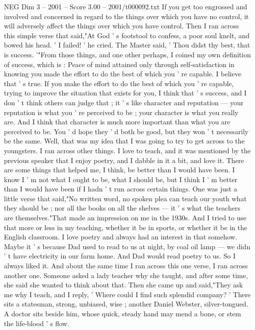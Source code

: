 \begin{textsample}{NEG Dim 3 – 2001 – Score 3.00 – 2001/t000092.txt}
If you get too engrossed and involved and concerned in regard to the things over which you have no control, it will adversely affect the things over which you have control.
Then I ran across this simple verse that said,"At God ' s footstool to confess, a poor soul knelt, and bowed his head. ' I failed! ' he cried.
The Master said, ' Thou didst thy best, that is success. '"From those things, and one other perhaps, I coined my own definition of success, which is : Peace of mind attained only through self-satisfaction in knowing you made the effort to do the best of which you ' re capable.
I believe that ' s true.
If you make the effort to do the best of which you ' re capable, trying to improve the situation that exists for you, I think that ' s success, and I don ' t think others can judge that ; it ' s like character and reputation — your reputation is what you ' re perceived to be ; your character is what you really are.
And I think that character is much more important than what you are perceived to be.
You ' d hope they ' d both be good, but they won ' t necessarily be the same.
Well, that was my idea that I was going to try to get across to the youngsters.
I ran across other things.
I love to teach, and it was mentioned by the previous speaker that I enjoy poetry, and I dabble in it a bit, and love it.
There are some things that helped me, I think, be better than I would have been.
I know I ' m not what I ought to be, what I should be, but I think I ' m better than I would have been if I hadn ' t run across certain things.
One was just a little verse that said,"No written word, no spoken plea can teach our youth what they should be ; nor all the books on all the shelves — it ' s what the teachers are themselves."That made an impression on me in the 1930s.
And I tried to use that more or less in my teaching, whether it be in sports, or whether it be in the English classroom.
I love poetry and always had an interest in that somehow.
Maybe it ' s because Dad used to read to us at night, by coal oil lamp — we didn ' t have electricity in our farm home.
And Dad would read poetry to us.
So I always liked it.
And about the same time I ran across this one verse, I ran across another one.
Someone asked a lady teacher why she taught, and after some time, she said she wanted to think about that.
Then she came up and said,"They ask me why I teach, and I reply, ' Where could I find such splendid company? ' There sits a statesman, strong, unbiased, wise ; another Daniel Webster, silver-tongued.
A doctor sits beside him, whose quick, steady hand may mend a bone, or stem the life-blood ' s flow.

\end{textsample}

